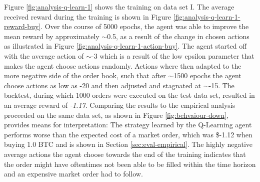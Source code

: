 Figure \ref{fig:analysis-q-learn-1} shows the training on data set I.
The average received reward during the training is shown in Figure \ref{fig:analysis-q-learn-1-reward-buy}.
Over the course of 5000 epochs, the agent was able to improve the mean reward by approximately $\sim$0.5, as a result of the change in chosen actions as illustrated in Figure \ref{fig:analysis-q-learn-1-action-buy}.
The agent started off with the average action of $\sim$-3 which is a result of the low epsilon parameter that makes the agent choose actions randomly.
Actions where then adapted to the more negative side of the order book, such that after $\sim$1500 epochs the agent choose actions as low as -20 and then adjusted and stagnated at $\sim$-15.
The backtest, during which 1000 orders were executed on the test data set, resulted in an average reward of \textit{-1.17}.
Comparing the results to the empirical analysis proceeded on the same data set, as shown in Figure \ref{fig:behvaiour-down}, provides means for interpretation:
The strategy learned by the Q-Learning agent performs worse than the expected cost of a market order, which was \$-1.12 when buying 1.0 BTC and is shown in Section \ref{sec:eval-empirical}.
The highly negative average actions the agent choose towards the end of the training indicates that the order might have oftentimes not been able to be filled within the time horizon and an expensive market order had to follow.

